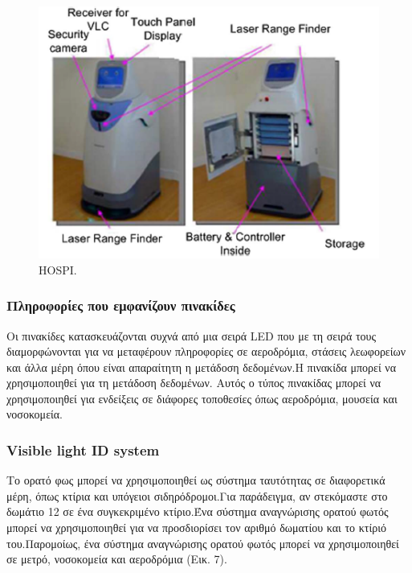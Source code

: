 \documentclass[conference]{IEEEtran}
\begin{document}
\begin{figure}[h]
  \includegraphics[width=\linewidth]{4.png}
  \caption{HOSPI.} 
\end{figure}

\subsubsection{Πληροφορίες που εμφανίζουν πινακίδες}
Οι πινακίδες κατασκευάζονται συχνά από μια σειρά LED που με τη σειρά τους διαμορφώνονται για να μεταφέρουν πληροφορίες σε αεροδρόμια, στάσεις λεωφορείων και άλλα
μέρη όπου είναι απαραίτητη η μετάδοση δεδομένων.Η πινακίδα μπορεί να χρησιμοποιηθεί για τη μετάδοση δεδομένων. Αυτός ο τύπος πινακίδας μπορεί να χρησιμοποιηθεί για ενδείξεις σε διάφορες τοποθεσίες όπως αεροδρόμια, μουσεία και νοσοκομεία.



\subsubsection{Visible light ID system}
 Το ορατό φως μπορεί να χρησιμοποιηθεί ως σύστημα ταυτότητας σε διαφορετικά μέρη, όπως κτίρια και υπόγειοι σιδηρόδρομοι.Για παράδειγμα, αν στεκόμαστε στο δωμάτιο 12 σε ένα συγκεκριμένο κτίριο.Ένα σύστημα αναγνώρισης ορατού φωτός μπορεί να χρησιμοποιηθεί για να προσδιορίσει τον αριθμό δωματίου και το κτίριό του.Παρομοίως, ένα σύστημα αναγνώρισης ορατού φωτός μπορεί να χρησιμοποιηθεί σε μετρό, νοσοκομεία και αεροδρόμια (Εικ. 7).
\end{document}
